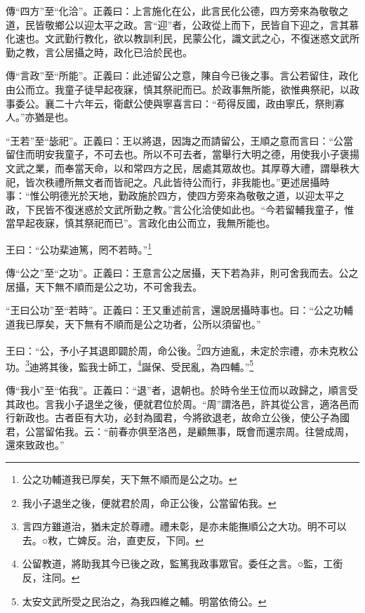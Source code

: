 {\noindent\zhuan{}\fzbyks 傳“四方”至“化洽”。正義曰：上言施化在公，此言民化公德，四方旁來為敬敬之道，民皆敬鄉公以迎太平之政。言“迎”者，公政從上而下，民皆自下迎之，言其慕化速也。文武勤行教化，欲以教訓利民，民蒙公化，識文武之心，不復迷惑文武所勤之教，言公居攝之時，政化已洽於民也。 \par}

{\noindent\zhuan{}\fzbyks 傳“言政”至“所能”。正義曰：此述留公之意，陳自今已後之事。言公若留住，政化由公而立。我童子徒早起夜寐，慎其祭祀而已。於政事無所能，欲惟典祭祀，以政事委公。襄二十六年云，衛獻公使與寧喜言曰：“苟得反國，政由寧氏，祭則寡人。”亦猶是也。 \par}

{\noindent\shu{}\fzkt “王若”至“毖祀”。正義曰：王以將退，因誨之而請留公，王順之意而言曰：“公當留住而明安我童子，不可去也。所以不可去者，當舉行大明之德，用使我小子褒揚文武之業，而奉當天命，以和常四方之民，居處其眾故也。其厚尊大禮，謂舉秩大祀，皆次秩禮所無文者而皆祀之。凡此皆待公而行，非我能也。”更述居攝時事：“惟公明德光於天地，勤政施於四方，使四方旁來為敬敬之道，以迎太平之政，下民皆不復迷惑於文武所勤之教。”言公化洽使如此也。“今若留輔我童子，惟當早起夜寐，慎其祭祀而已”。言政化由公而立，我無所能也。 \par}

王曰：“公功棐迪篤，罔不若時。”\footnote{公之功輔道我已厚矣，天下無不順而是公之功。}

{\noindent\zhuan{}\fzbyks 傳“公之”至“之功”。正義曰：王意言公之居攝，天下若為非，則可舍我而去。公之居攝，天下無不順而是公之功，不可舍我去。 \par}

{\noindent\shu{}\fzkt “王曰公功”至“若時”。正義曰：王又重述前言，還說居攝時事也。曰：“公之功輔道我已厚矣，天下無有不順而是公之功者，公所以須留也。” \par}

王曰：“公，予小子其退即闢於周，命公後。\footnote{我小子退坐之後，便就君於周，命正公後，公當留佑我。}四方迪亂，未定於宗禮，亦未克敉公功。\footnote{言四方雖道治，猶未定於尊禮。禮未彰，是亦未能撫順公之大功。明不可以去。○敉，亡婢反。治，直吏反，下同。}迪將其後，監我士師工，\footnote{公留教道，將助我其今已後之政，監篤我政事眾官。委任之言。○監，工銜反，注同。}誕保、受民亂，為四輔。”\footnote{太安文武所受之民治之，為我四維之輔。明當依倚公。}


{\noindent\zhuan{}\fzbyks 傳“我小”至“佑我”。正義曰：“退”者，退朝也。於時令坐王位而以政歸之，順言受其政也。言我小子退坐之後，便就君位於周。“周”謂洛邑，許其從公言，適洛邑而行新政也。古者臣有大功，必封為國君，今將欲退老，故命立公後，使公子為國君，公當留佑我。云：“前春亦俱至洛邑，是顧無事，既會而還宗周。往營成周，還來致政也。” \par}

